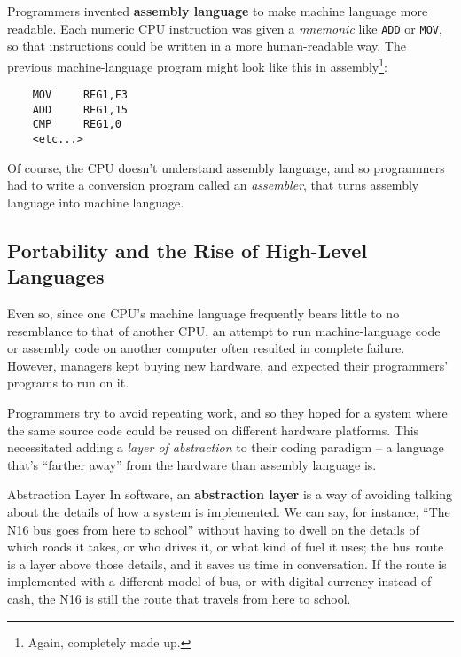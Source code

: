 Programmers invented \textbf{assembly language} to make machine language more readable.  Each numeric CPU instruction was given a \textit{mnemonic} like \verb-ADD- or \verb-MOV-, so that instructions could be written in a more human-readable way.  The previous machine-language program might look like this in assembly\footnote{Again, completely made up.}:

\begin{minipage}{\textwidth}
\begin{verbatim}
    MOV     REG1,F3
    ADD     REG1,15
    CMP     REG1,0
    <etc...>
\end{verbatim}
\end{minipage}

Of course, the CPU doesn't understand assembly language, and so programmers had to write a conversion program called an \textit{assembler}, that turns assembly language into machine language.

\subsection{Portability and the Rise of High-Level Languages}

Even so, since one CPU's machine language frequently bears little to no resemblance to that of another CPU, an attempt to run machine-language code or assembly code on another computer often resulted in complete failure.  However, managers kept buying new hardware, and expected their programmers' programs to run on it.

Programmers try to avoid repeating work, and so they hoped for a system where the same source code could be reused on different hardware platforms.  This necessitated adding a \textit{layer of abstraction} to their coding paradigm -- a language that's ``farther away'' from the hardware than assembly language is.

\begin{defn}{Abstraction Layer}
    In software, an \textbf{abstraction layer} is a way of avoiding talking about the details of how a system is implemented.  We can say, for instance, ``The N16 bus goes from here to school'' without having to dwell on the details of which roads it takes, or who drives it, or what kind of fuel it uses; the bus route is a layer above those details, and it saves us time in conversation.  If the route is implemented with a different model of bus, or with digital currency instead of cash, the N16 is still the route that travels from here to school.
\end{defn}


